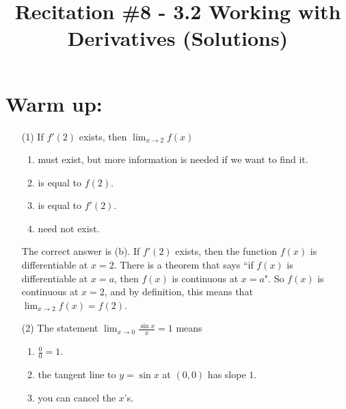 \documentclass[nooutcomes]{ximera}
\title{Recitation \#8 - 3.2 Working with Derivatives (Solutions)}
\begin{document}
\begin{abstract}		\end{abstract}
\maketitle

\section*{Warm up:} 
	
	\begin{enumerate}
	
	\item[(1)] If $f'(2)$ exists, then $\lim_{x \to 2} f(x)$
	
		\begin{enumerate}
		
		\item must exist, but more information is needed if we want to find it.
		
		\item is equal to $f(2)$.
		
		\item is equal to $f'(2)$.
		
		\item need not exist.
		
		\end{enumerate}
	
			\begin{freeResponse}
			The correct answer is (b).  If $f'(2)$ exists, then the function $f(x)$ is differentiable at $x=2$.  There is a theorem that says ``if $f(x)$ is differentiable at $x=a$, then $f(x)$ is continuous at $x=a$".  So $f(x)$ is continuous at $x=2$, and by definition, this means that $\lim_{x \to 2} f(x) = f(2)$.
			\end{freeResponse}
	
	\item[(2)] The statement $\lim_{x \to 0} \frac{\sin x}{x} = 1$ means
	
		\begin{enumerate}
		
		\item $\frac{0}{0} = 1$.
		
		\item the tangent line to $y = \sin x$ at $(0,0)$ has slope $1$.
		
		\item you can cancel the $x$'s.
		

\end{enumerate}
\end{enumerate}
\end{document}

